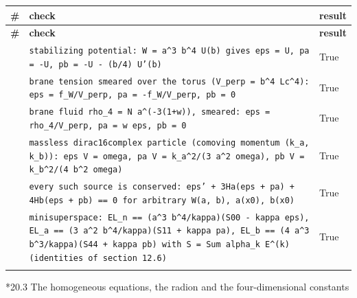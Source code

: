 \documentclass[10pt,a4paper]{article}
\makeatletter
\renewcommand\subsubsection{\@startsection{subsubsection}{3}{\z@}{-3.25ex\@plus -1ex \@minus -.2ex}{1.5ex \@plus .2ex}{\normalfont\normalsize\bfseries\raggedright}}
\makeatother
\begin{document}
{\footnotesize
\begin{longtable}{>{\raggedright\arraybackslash}p{}>{\raggedright\arraybackslash}p{}>{\raggedright\arraybackslash}p{}}
\toprule
\textbf{\#} & \textbf{check} & \textbf{result} \\
\midrule\endfirsthead
\toprule
\textbf{\#} & \textbf{check} & \textbf{result} \\
\midrule\endhead
\endfoot
\bottomrule\endlastfoot
354 & \texttt{stabilizing potential: W = a\textasciicircum{}3 b\textasciicircum{}4 U(b) gives eps = U, pa = -U, pb = -U - (b/\allowbreak{}4) U'(b)} & True \\
355 & \texttt{brane tension smeared over the torus (V\_\allowbreak{}perp = b\textasciicircum{}4 Lc\textasciicircum{}4): eps = f\_\allowbreak{}W/\allowbreak{}V\_\allowbreak{}perp, pa = -f\_\allowbreak{}W/\allowbreak{}V\_\allowbreak{}perp, pb = 0} & True \\
356 & \texttt{brane fluid rho\_\allowbreak{}4 = N a\textasciicircum{}(-3(1+w)), smeared: eps = rho\_\allowbreak{}4/\allowbreak{}V\_\allowbreak{}perp, pa = w eps, pb = 0} & True \\
357 & \texttt{massless dirac16complex particle (comoving momentum (k\_\allowbreak{}a, k\_\allowbreak{}b)): eps V = omega, pa V = k\_\allowbreak{}a\textasciicircum{}2/\allowbreak{}(3 a\textasciicircum{}2 omega), pb V = k\_\allowbreak{}b\textasciicircum{}2/\allowbreak{}(4 b\textasciicircum{}2 omega)} & True \\
358 & \texttt{every such source is conserved: eps' + 3Ha(eps + pa) + 4Hb(eps + pb) == 0 for arbitrary W(a, b), a(x0), b(x0)} & True \\
359 & \texttt{minisuperspace: EL\_\allowbreak{}n == (a\textasciicircum{}3 b\textasciicircum{}4/\allowbreak{}kappa)(S00 - kappa eps), EL\_\allowbreak{}a == (3 a\textasciicircum{}2 b\textasciicircum{}4/\allowbreak{}kappa)(S11 + kappa pa), EL\_\allowbreak{}b == (4 a\textasciicircum{}3 b\textasciicircum{}3/\allowbreak{}kappa)(S44 + kappa pb) with S = Sum alpha\_\allowbreak{}k E\textasciicircum{}(k) (identities of section 12.6)} & True \\*
\end{longtable}}
\subsubsection*{20.3 The homogeneous equations, the radion and the four-dimensional constants}
\end{document}

